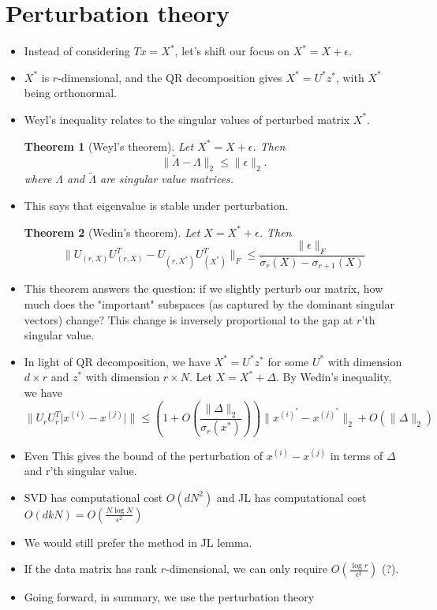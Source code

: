 \documentclass[11pt,reqno]{amsart}
\newtheorem{theorem}{Theorem}
\theoremstyle{remark}
\begin{document}
\begin{sloppypar}
\section{Perturbation theory}
\begin{itemize}
\item Instead of considering $Tx=X^*$, let's shift our focus on $X^* = X+\epsilon$.
\item $X^*$ is $r$-dimensional, and the QR decomposition gives $X^*=U^*z^*$, with 
$X^*$ being orthonormal.
\item Weyl's inequality relates to the singular values of perturbed matrix $X^*$.
\begin{theorem}[Weyl's theorem]\label{Theorem:Weyl}
Let $X^*=X+\epsilon$. Then
\[
\lVert \tilde\Lambda-\Lambda\rVert_2\leq\lVert\epsilon\rVert_2.
\]
where $\Lambda$ and $\tilde\Lambda$ are singular value matrices.
\end{theorem}
\item This says that eigenvalue is stable under perturbation. 
\begin{theorem}[Wedin's theorem]
Let $X=X^*+\epsilon$. Then 
\[
\lVert U_{(r,X)} U_{(r,X)}^T-U_{(r,X^*)} U_{(X^*)}^T\rVert_{F}\leq
\frac{\lVert\epsilon\rVert_{F}}{\sigma_r(X)-\sigma_{r+1}(X)}
\]
\end{theorem}
\item This theorem answers the question: if we slightly perturb our matrix, 
how much does the "important" subspaces (as captured by the dominant singular vectors)
 change? This change is inversely proportional to the gap at $r$'th singular value.
\item In light of QR decomposition, we have $X^* = U^* z^*$ for some 
$U^*$ with dimension $d\times r$ and $z^*$ with dimension $r\times N$. Let $X=X^*+\Delta$. By Wedin's inequality, we have
\[
\lVert U_r U_r^T \lvert x^{(i)}-x^{(j)}\rvert\rVert\leq (1+O(\frac{\lVert 
  \Delta\rVert_2}{\sigma_r(x^*)}))\lVert x^{(i)^*}
  -x^{(j)^*}\rVert_2+O(\lVert\Delta\rVert_2)
\]
\item Even This gives the bound of the perturbation of $x^{(i)}-x^{(j)}$ in terms 
of $\Delta$ and r'th singular value. 
\item SVD has computational cost $O(dN^2)$ and JL has computational cost 
$O(dkN)=O(\frac{N\log N}{\epsilon^2})$
\item We would still prefer the method in JL lemma.
\item If the data matrix has rank $r$-dimensional, we can only require $O(\frac{\log r}{\epsilon^2})$ (?).
 \item Going forward, in summary, we use the perturbation theory 

\end{itemize}
\end{sloppypar}
\end{document}
